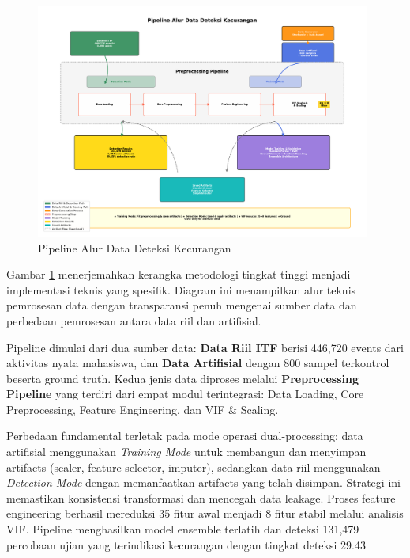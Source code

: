 \begin{figure}[htbp]
    \centering
    \includegraphics[width=0.98\textwidth]{newfigures/technical_pipeline_flow_final.pdf}
    \caption{Pipeline Alur Data Deteksi Kecurangan}
    \label{fig:technical_pipeline}
\end{figure}

Gambar \ref{fig:technical_pipeline} menerjemahkan kerangka metodologi tingkat tinggi menjadi implementasi teknis yang spesifik. Diagram ini menampilkan alur teknis pemrosesan data dengan transparansi penuh mengenai sumber data dan perbedaan pemrosesan antara data riil dan artifisial. 

Pipeline dimulai dari dua sumber data: \textbf{Data Riil ITF} berisi 446,720 events dari aktivitas nyata mahasiswa, dan \textbf{Data Artifisial} dengan 800 sampel terkontrol beserta ground truth. Kedua jenis data diproses melalui \textbf{Preprocessing Pipeline} yang terdiri dari empat modul terintegrasi: Data Loading, Core Preprocessing, Feature Engineering, dan VIF \& Scaling.

Perbedaan fundamental terletak pada mode operasi dual-processing: data artifisial menggunakan \textit{Training Mode} untuk membangun dan menyimpan artifacts (scaler, feature selector, imputer), sedangkan data riil menggunakan \textit{Detection Mode} dengan memanfaatkan artifacts yang telah disimpan. Strategi ini memastikan konsistensi transformasi dan mencegah data leakage. Proses feature engineering berhasil mereduksi 35 fitur awal menjadi 8 fitur stabil melalui analisis VIF. Pipeline menghasilkan model ensemble terlatih dan deteksi 131,479 percobaan ujian yang terindikasi kecurangan dengan tingkat deteksi 29.43%

